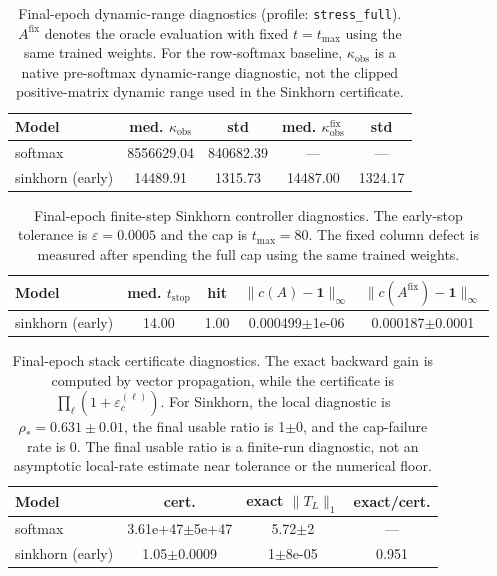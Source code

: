\begin{table}[t]
\centering
\small
\begin{tabular}{lcccc}
\toprule
Model & med. $\kappa_{\mathrm{obs}}$ & std & med. $\kappa_{\mathrm{obs}}^{\mathrm{fix}}$ & std \\
\midrule
softmax & 8556629.04 & 840682.39 & --- & --- \\
sinkhorn (early) & 14489.91 & 1315.73 & 14487.00 & 1324.17 \\
\bottomrule
\end{tabular}
\caption{Final-epoch dynamic-range diagnostics (profile: \texttt{stress\_full}). $A^{\mathrm{fix}}$ denotes the oracle evaluation with fixed $t=t_{\max}$ using the same trained weights. For the row-softmax baseline, $\kappa_{\mathrm{obs}}$ is a native pre-softmax dynamic-range diagnostic, not the clipped positive-matrix dynamic range used in the Sinkhorn certificate.}
\label{tab:final_epoch_dynamic_range_diag}
\end{table}

\begin{table}[t]
\centering
\small
\begin{tabular}{lcccc}
\toprule
Model & med. $t_{\mathrm{stop}}$ & hit & $\|c(A)-\mathbf{1}\|_{\infty}$ & $\|c(A^{\mathrm{fix}})-\mathbf{1}\|_{\infty}$ \\
\midrule
sinkhorn (early) & 14.00 & 1.00 & 0.000499$\pm$1e-06 & 0.000187$\pm$0.0001 \\
\bottomrule
\end{tabular}
\caption{Final-epoch finite-step Sinkhorn controller diagnostics. The early-stop tolerance is $\varepsilon=0.0005$ and the cap is $t_{\max}=80$. The fixed column defect is measured after spending the full cap using the same trained weights.}
\label{tab:final_epoch_sinkhorn_controller_diag}
\end{table}

\begin{table}[t]
\centering
\small
\begin{tabular}{lccc}
\toprule
Model & cert. & exact $\|T_L\|_1$ & exact/cert. \\
\midrule
softmax & 3.61e+47$\pm$5e+47 & 5.72$\pm$2 & --- \\
sinkhorn (early) & 1.05$\pm$0.0009 & 1$\pm$8e-05 & 0.951 \\
\bottomrule
\end{tabular}
\caption{Final-epoch stack certificate diagnostics. The exact backward gain is computed by vector propagation, while the certificate is $\prod_\ell(1+\varepsilon_c^{(\ell)})$. For Sinkhorn, the local diagnostic is $\rho_*=0.631\pm0.01$, the final usable ratio is 1$\pm$0, and the cap-failure rate is 0. The final usable ratio is a finite-run diagnostic, not an asymptotic local-rate estimate near tolerance or the numerical floor.}
\label{tab:stack_certificate_diag}
\end{table}
